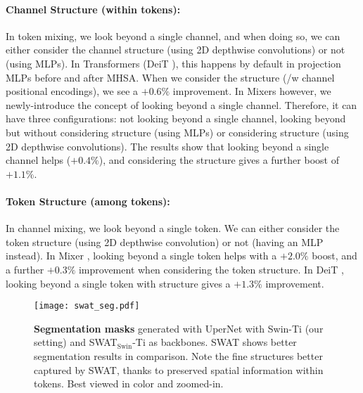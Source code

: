\documentclass[10pt,twocolumn,letterpaper]{article}
\begin{document}
\paragraph{Channel Structure (within tokens):} In token mixing, we look beyond a single channel, and when doing so, we can either consider the channel structure (using 2D depthwise convolutions) or not (using MLPs). In Transformers (DeiT \cite{touvron2021deit}), this happens by default in projection MLPs before and after MHSA. When we consider the structure (/w channel positional encodings), we see a $+0.6\%$ improvement. In Mixers however, we newly-introduce the concept of looking beyond a single channel. Therefore, it can have three configurations: not looking beyond a single channel, looking beyond but without considering structure (using MLPs) or considering structure (using 2D depthwise convolutions). The results show that looking beyond a single channel helps ($+0.4\%$), and considering the structure gives a further boost of $+1.1\%$.

\paragraph{Token Structure (among tokens):} In channel mixing, we look beyond a single token. We can either consider the token structure (using 2D depthwise convolution) or not (having an MLP instead). In Mixer \cite{tolstikhin2021mixer}, looking beyond a single token helps with a $+2.0\%$ boost, and a further $+0.3\%$ improvement when considering the token structure. In DeiT \cite{touvron2021deit}, looking beyond a single token with structure gives a $+1.3\%$ improvement.



\begin{figure*}[t]
	\centering
	\texttt{[image: swat\_seg.pdf]}
	\caption{\textbf{Segmentation masks} generated with UperNet \cite{xiao2018unified} with Swin-Ti \cite{liu2021swin} (our setting) and SWAT$_\text{Swin}$-Ti as backbones. SWAT shows better segmentation results in comparison. Note the fine structures better captured by SWAT, thanks to preserved spatial information within tokens. Best viewed in color and zoomed-in. }
	\vspace{-4mm}
	\label{fig:seg}
\end{figure*}
\end{document}
